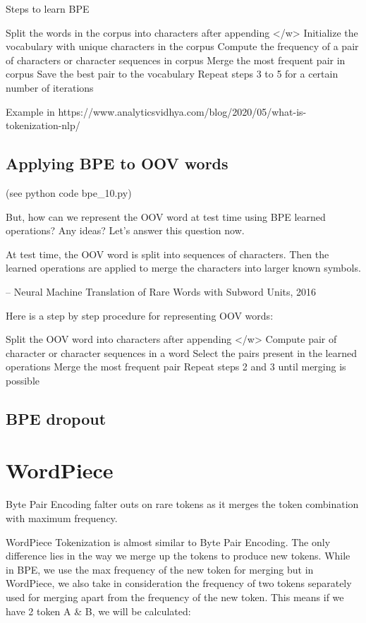 Steps to learn BPE

    Split the words in the corpus into characters after appending </w>
    Initialize the vocabulary with unique characters in the corpus
    Compute the frequency of a pair of characters or character sequences in corpus
    Merge the most frequent pair in corpus
    Save the best pair to the vocabulary
    Repeat steps 3 to 5 for a certain number of iterations

Example in https://www.analyticsvidhya.com/blog/2020/05/what-is-tokenization-nlp/

\subsection{Applying BPE to OOV words}

(see python code bpe\_10.py)

But, how can we represent the OOV word at test time using BPE learned operations? Any ideas? Let’s answer this question now.

    At test time, the OOV word is split into sequences of characters. Then the learned operations are applied to merge the characters into larger known symbols.

    – Neural Machine Translation of Rare Words with Subword Units, 2016

Here is a step by step procedure for representing OOV words:

    Split the OOV word into characters after appending </w>
    Compute pair of character or character sequences in a word
    Select the pairs present in the learned operations
    Merge the most frequent pair
    Repeat steps 2 and 3 until merging is possible

\subsection{BPE dropout}

\section{WordPiece}

Byte Pair Encoding falter outs on rare tokens as it merges the token combination with maximum frequency.

WordPiece Tokenization is almost similar to Byte Pair Encoding. The only difference lies in the way we merge up the tokens to produce new tokens. While in BPE, we use the max frequency of the new token for merging but in WordPiece, we also take in consideration the frequency of two tokens separately used for merging apart from the frequency of the new token. This means if we have 2 token A \& B, we will be calculated:


